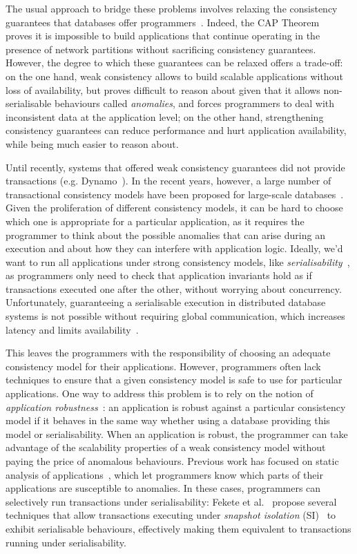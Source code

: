 The usual approach to bridge these problems involves relaxing the consistency guarantees that databases offer programmers~\citep{vogels-eventual}. Indeed, the CAP Theorem~\citep{cap-brewer, cap-theorem} proves it is impossible to build applications that continue operating in the presence of network partitions without sacrificing consistency guarantees. However, the degree to which these guarantees can be relaxed offers a trade-off: on the one hand, weak consistency allows to build scalable applications without loss of availability, but proves difficult to reason about given that it allows non-serialisable behaviours called \emph{anomalies}, and forces programmers to deal with inconsistent data at the application level; on the other hand, strengthening consistency guarantees can reduce performance and hurt application availability, while being much easier to reason about.

Until recently, systems that offered weak consistency guarantees did not provide transactions (e.g. Dynamo~\citep{dynamo-amz}). In the recent years, however, a large number of transactional consistency models have been proposed for large-scale databases~\citep{psi-intro, ardekani_nmsi, lloyd_cops, bailis_ramp}. Given the proliferation of different consistency models, it can be hard to choose which one is appropriate for a particular application, as it requires the programmer to think about the possible anomalies that can arise during an execution and about how they can interfere with application logic. Ideally, we'd want to run all applications under strong consistency models, like \emph{serialisability}~\citep{bernstein_concurrency}, as programmers only need to check that application invariants hold as if transactions executed one after the other, without worrying about concurrency. Unfortunately, guaranteeing a serialisable execution in distributed database systems is not possible without requiring global communication, which increases latency and limits availability~\citep{cap-theorem}.

This leaves the programmers with the responsibility of choosing an adequate consistency model for their applications. However, programmers often lack techniques to ensure that a given consistency model is safe to use for particular applications. One way to address this problem is to rely on the notion of \emph{application robustness}~\citep{fekete_ssi, concur_robustness}: an application is robust against a particular consistency model if it behaves in the same way whether using a database providing this model or serialisability. When an application is robust, the programmer can take advantage of the scalability properties of a weak consistency model without paying the price of anomalous behaviours. Previous work has focused on static analysis of applications~\citep{sudhir_static, cise_tool}, which let programmers know which parts of their applications are susceptible to anomalies. In these cases, programmers can selectively run transactions under serialisability: Fekete et al.~\citep{fekete_ssi, fekete_isolation_levels} propose several techniques that allow transactions executing under \emph{snapshot isolation} (SI)~\citep{sql-critique} to exhibit serialisable behaviours, effectively making them equivalent to transactions running under serialisability.

